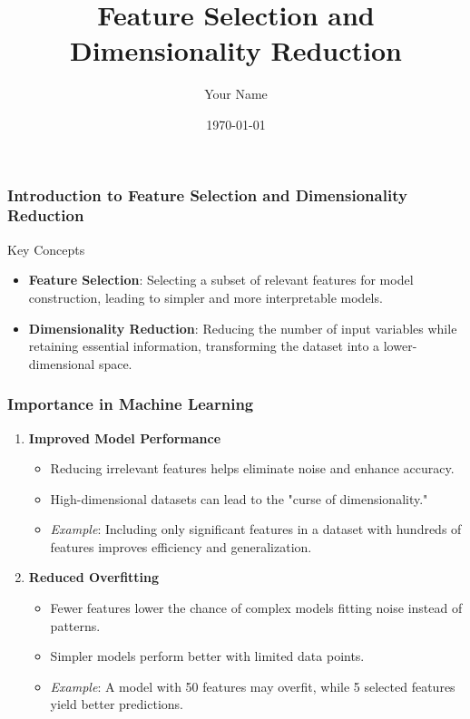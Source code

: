 \documentclass{beamer}
\title{Feature Selection and Dimensionality Reduction}
\author{Your Name}
\institute{Your Institution}
\date{\today}
\begin{document}
\frame{\titlepage}

\begin{frame}[fragile]
    \frametitle{Introduction to Feature Selection and Dimensionality Reduction}
    \begin{block}{Key Concepts}
        \begin{itemize}
            \item \textbf{Feature Selection}: Selecting a subset of relevant features for model construction, leading to simpler and more interpretable models.
            \item \textbf{Dimensionality Reduction}: Reducing the number of input variables while retaining essential information, transforming the dataset into a lower-dimensional space.
        \end{itemize}
    \end{block}
\end{frame}

\begin{frame}[fragile]
    \frametitle{Importance in Machine Learning}
    \begin{enumerate}
        \item \textbf{Improved Model Performance}
            \begin{itemize}
                \item Reducing irrelevant features helps eliminate noise and enhance accuracy.
                \item High-dimensional datasets can lead to the "curse of dimensionality."
                \item \textit{Example}: Including only significant features in a dataset with hundreds of features improves efficiency and generalization.
            \end{itemize}
        
        \item \textbf{Reduced Overfitting}
            \begin{itemize}
                \item Fewer features lower the chance of complex models fitting noise instead of patterns.
                \item Simpler models perform better with limited data points.
                \item \textit{Example}: A model with 50 features may overfit, while 5 selected features yield better predictions.
            \end{itemize}
    \end{enumerate}
\end{frame}
\end{document}

